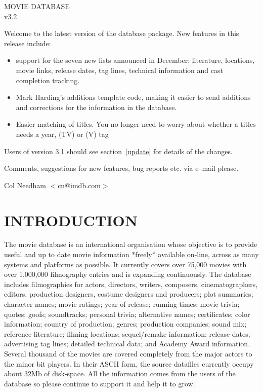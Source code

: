
\begin{titlepage}
\vspace{6.5in}
\begin{center}
{\huge MOVIE DATABASE\\
\Large v3.2}
\end{center}
\vspace{1in}

Welcome to the latest version of the database package. New features in
this release include:
\begin{itemize}
\item support for the seven new lists announced in December: literature,
    locations, movie links, release dates, tag lines, technical information
    and cast completion tracking.
\item Mark Harding's additions template code, making it easier to send 
    additions and corrections for the information in the database.
\item Easier matching of titles. You no longer need to worry about whether
    a titles needs a year, (TV) or (V) tag

\end{itemize}

Users of version 3.1 should see section~\ref{update} for details of the changes.

Comments, suggestions for new features, bug reports etc. via e--mail 
please.

\vspace{.5in}
\noindent Col Needham $<$cn@imdb.com$>$
\end{titlepage}
\clearpage

\tableofcontents
\clearpage
\section{\label{intr}INTRODUCTION}

The movie database is an international organisation whose objective
is to provide useful and up to date movie information *freely* available 
on-line, across as 
many systems and platforms as possible. It currently covers over 75,000 movies
with over 1,000,000 filmography entries and is expanding continuously. The 
database includes filmographies for actors, directors, writers, composers, 
cinematographers, editors, production designers, costume designers and 
producers; plot summaries; character names; movie ratings; year of 
release; 
running times; movie trivia; quotes; goofs; soundtracks; personal trivia;
alternative names; certificates; color information; country of production;
genres; production companies; sound mix; reference literature; filming 
locations; sequel/remake information; release dates; advertising tag lines;
detailed technical data; and Academy Award information. Several thousand of 
the movies are covered completely from the major actors to the minor bit 
players. In their ASCII form, the source datafiles currently occupy about 32Mb
of disk-space. All the information comes from the users of the database so 
please continue to support it and help it to grow.

